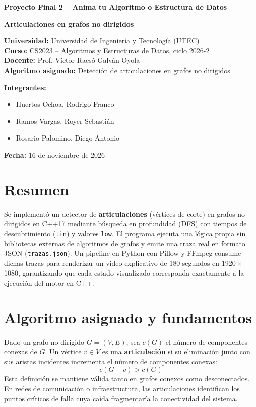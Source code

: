 \documentclass[11pt,a4paper]{article}
\begin{document}
\thispagestyle{fancy}

\vspace*{1.5cm}
\begin{center}
  {\LARGE\bfseries\color{navy} Proyecto Final 2 -- Anima tu Algoritmo o Estructura de Datos\par}
  \vspace{0.8cm}
  {\Large\bfseries\color{teal} Articulaciones en grafos no dirigidos\par}
\end{center}
\vspace{1.3cm}

\textbf{Universidad:} Universidad de Ingeniería y Tecnología (UTEC)\\[0.25em]
\textbf{Curso:} CS2023 -- Algoritmos y Estructuras de Datos, ciclo 2026-2\\[0.25em]
\textbf{Docente:} Prof. Víctor Racsó Galván Oyola\\[0.25em]
\textbf{Algoritmo asignado:} Detección de articulaciones en grafos no dirigidos

\vspace{0.7cm}
\textbf{Integrantes:}
\begin{itemize}
  \item Huertos Ochoa, Rodrigo Franco
  \item Ramos Vargas, Royer Sebastián
  \item Rosario Palomino, Diego Antonio
\end{itemize}

\vspace{0.5cm}
\textbf{Fecha:} 16 de noviembre de 2026

\newpage

\section*{Resumen}
Se implementó un detector de \textbf{articulaciones} (vértices de corte) en
grafos no dirigidos en C++17 mediante búsqueda en profundidad (DFS) con tiempos
de descubrimiento (\texttt{tin}) y valores \texttt{low}. El programa ejecuta
una lógica propia sin bibliotecas externas de algoritmos de grafos y emite una
traza real en formato JSON (\texttt{trazas.json}). Un pipeline en Python con
Pillow y FFmpeg consume dichas trazas para renderizar un video explicativo de
180 segundos en 1920\,$\times$\,1080, garantizando que cada estado visualizado
corresponda exactamente a la ejecución del motor en C++.

\section{Algoritmo asignado y fundamentos}
Dado un grafo no dirigido $G=(V,E)$, sea $c(G)$ el número de componentes
conexas de $G$. Un vértice $v \in V$ es una \textbf{articulación} si su
eliminación junto con sus aristas incidentes incrementa el número de
componentes conexas:
\[
  c(G - v) > c(G)
\]
Esta definición se mantiene válida tanto en grafos conexos como desconectados.
En redes de comunicación o infraestructura, las articulaciones identifican los
puntos críticos de falla cuya caída fragmentaría la conectividad del sistema.
\end{document}
